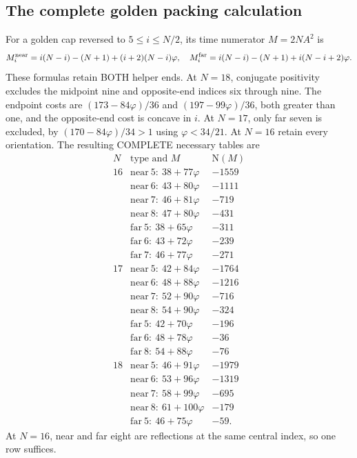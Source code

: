 \subsection{The complete golden packing calculation}
\label{app:arithgoldenpacking}

For a golden cap reversed to \(5\le i\le N/2\), its time
numerator \(M=2NA^2\) is
\[
 M_i^{\rm near}=i(N-i)-(N+1)+(i+2)(N-i)\varphi,\quad
 M_i^{\rm far}=i(N-i)-(N+1)+i(N-i+2)\varphi .
\]
These formulas retain BOTH helper ends.
At \(N=18\), conjugate positivity excludes the midpoint nine
and opposite-end indices six through nine.
The endpoint costs are \((173-84\varphi)/36\) and
\((197-99\varphi)/36\), both greater than one, and the
opposite-end cost is concave in \(i\).
At \(N=17\), only far seven is excluded, by
\((170-84\varphi)/34>1\) using \(\varphi<34/21\).
At \(N=16\) retain every orientation.
The resulting COMPLETE necessary tables are
\[
\begin{array}{c|c|r}
 N&\text{type and }M&\mathrm N(M)\\ \hline
16&\mathrm{near}\ 5:\ 38+77\varphi&-1559\\
 &\mathrm{near}\ 6:\ 43+80\varphi&-1111\\
 &\mathrm{near}\ 7:\ 46+81\varphi&-719\\
 &\mathrm{near}\ 8:\ 47+80\varphi&-431\\
 &\mathrm{far}\ 5:\ 38+65\varphi&-311\\
 &\mathrm{far}\ 6:\ 43+72\varphi&-239\\
 &\mathrm{far}\ 7:\ 46+77\varphi&-271\\ \hline
17&\mathrm{near}\ 5:\ 42+84\varphi&-1764\\
 &\mathrm{near}\ 6:\ 48+88\varphi&-1216\\
 &\mathrm{near}\ 7:\ 52+90\varphi&-716\\
 &\mathrm{near}\ 8:\ 54+90\varphi&-324\\
 &\mathrm{far}\ 5:\ 42+70\varphi&-196\\
 &\mathrm{far}\ 6:\ 48+78\varphi&-36\\
 &\mathrm{far}\ 8:\ 54+88\varphi&-76\\ \hline
18&\mathrm{near}\ 5:\ 46+91\varphi&-1979\\
 &\mathrm{near}\ 6:\ 53+96\varphi&-1319\\
 &\mathrm{near}\ 7:\ 58+99\varphi&-695\\
 &\mathrm{near}\ 8:\ 61+100\varphi&-179\\
 &\mathrm{far}\ 5:\ 46+75\varphi&-59 .
\end{array}
\]
At \(N=16\), near and far eight are reflections at the same
central index, so one row suffices.

